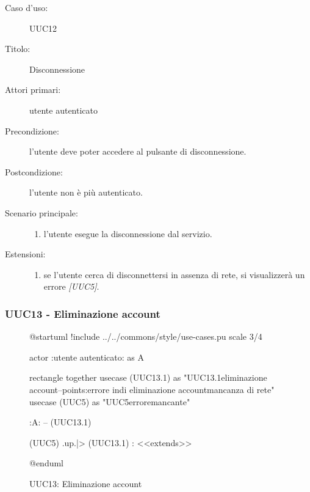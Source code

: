 \documentclass[../analisi-dei-requisiti.tex]{subfiles}
\begin{document}
  \begin{description}
  \item[Caso d’uso:] UUC12
  \item[Titolo:] Disconnessione
  \item[Attori primari:] utente autenticato
  \item[Precondizione:] l'utente deve poter accedere al pulsante di disconnessione.
  \item[Postcondizione:] l'utente non è più autenticato.
  \item[Scenario principale:]
        \begin{enumerate}
          \item l'utente esegue la disconnessione dal servizio.
        \end{enumerate}
  \item[Estensioni:]
        \begin{enumerate}
          \item se l'utente cerca di disconnettersi in assenza di rete, si visualizzerà un errore \emph{[UUC5]}.
        \end{enumerate}
\end{description}

\subsubsection{UUC13 - Eliminazione account}%
\label{subsub:UUC13utente}

\begin{figure}[h!]
  \centering
  \begin{plantuml}
  @startuml
  !include ../../commons/style/use-cases.pu
  scale 3/4

  actor :utente autenticato: as A

  rectangle {
    together {
      usecase (UUC13.1) as "UUC13.1\nConferma eliminazione account\n--\nExtension points:\nVisualizzazione errore in\ncaso di eliminazione account\nin mancanza di rete"
      usecase (UUC5) as "UUC5\nVisualizzazione errore\nrete mancante"
    }
  }

  :A: -- (UUC13.1)

  (UUC5) .up.|> (UUC13.1) : <<extends>>

  @enduml
  \end{plantuml}
  \caption{UUC13: Eliminazione account}
  \label{fig:uuc13}
\end{figure}
\end{document}
